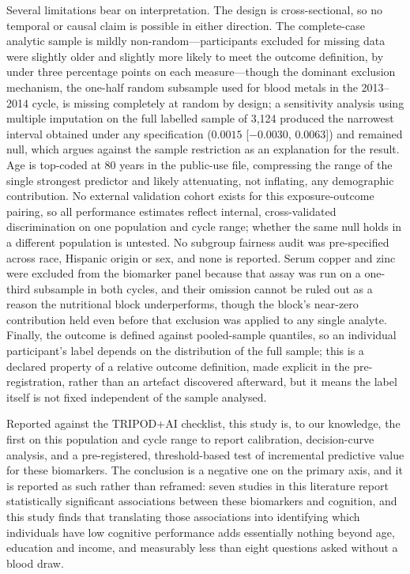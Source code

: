 \documentclass[12pt]{article}
\begin{document}
Several limitations bear on interpretation. The design is cross-sectional, so no temporal or causal claim is possible in either direction. The complete-case analytic sample is mildly non-random---participants excluded for missing data were slightly older and slightly more likely to meet the outcome definition, by under three percentage points on each measure---though the dominant exclusion mechanism, the one-half random subsample used for blood metals in the 2013--2014 cycle, is missing completely at random by design; a sensitivity analysis using multiple imputation on the full labelled sample of 3,124 produced the narrowest interval obtained under any specification ($0.0015$ [$-0.0030$, $0.0063$]) and remained null, which argues against the sample restriction as an explanation for the result. Age is top-coded at 80 years in the public-use file, compressing the range of the single strongest predictor and likely attenuating, not inflating, any demographic contribution. No external validation cohort exists for this exposure-outcome pairing, so all performance estimates reflect internal, cross-validated discrimination on one population and cycle range; whether the same null holds in a different population is untested. No subgroup fairness audit was pre-specified across race, Hispanic origin or sex, and none is reported. Serum copper and zinc were excluded from the biomarker panel because that assay was run on a one-third subsample in both cycles, and their omission cannot be ruled out as a reason the nutritional block underperforms, though the block's near-zero contribution held even before that exclusion was applied to any single analyte. Finally, the outcome is defined against pooled-sample quantiles, so an individual participant's label depends on the distribution of the full sample; this is a declared property of a relative outcome definition, made explicit in the pre-registration, rather than an artefact discovered afterward, but it means the label itself is not fixed independent of the sample analysed.

Reported against the TRIPOD+AI checklist, this study is, to our knowledge, the first on this population and cycle range to report calibration, decision-curve analysis, and a pre-registered, threshold-based test of incremental predictive value for these biomarkers. The conclusion is a negative one on the primary axis, and it is reported as such rather than reframed: seven studies in this literature report statistically significant associations between these biomarkers and cognition, and this study finds that translating those associations into identifying which individuals have low cognitive performance adds essentially nothing beyond age, education and income, and measurably less than eight questions asked without a blood draw.
\end{document}

